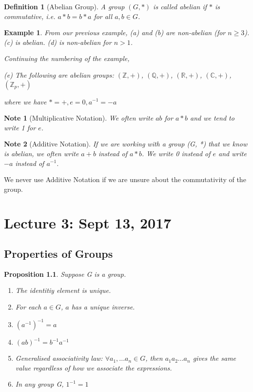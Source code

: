 \documentclass[11pt, oneside]{book}
\theoremstyle{break}
\newtheorem{propo}{Proposition}[section]
\newtheorem*{note}{Note}
\newtheorem{defn}{Definition}[section]
\newtheorem{eg}{Example}[section]
\newcommand{\bb}[1]{\mathbb{#1}}			%
\begin{document}
\begin{defn}[Abelian Group]
    A group $(G, *)$ is called abelian if $*$ is commutative, i.e. $a * b = b * a$ for all $a, b \in G$.
\end{defn}

\begin{eg}
   From our previous example, (a) and (b) are non-abelian (for $n \geq 3$). (c) is abelian. (d) is non-abelian for $n > 1$.

    Continuing the numbering of the example,

    (e) The following are abelian groups: $(\bb{Z}, +)$, $(\bb{Q}, +)$, $(\bb{R}, +)$, $(\bb{C}, +)$, $(\bb{Z}_p, +)$

    where we have $* = +, e = 0, a^{-1} = -a$
\end{eg}

\begin{note}[Multiplicative Notation]
    We often write $ab$ for $a*b$ and we tend to write 1 for $e$.
\end{note}

\begin{note}[Additive Notation]
    If we are working with a group (G, *) that we know is abelian, we often write $a + b$ instead of $a * b$. We write 0 instead of $e$ and write $-a$ instead of $a^{-1}$.
\end{note}

We never use Additive Notation if we are unsure about the commutativity of the group.

\chapter{Lecture 3: Sept 13, 2017}\label{lec3}

\section{Properties of Groups}

\begin{propo}
    Suppose G is a group.
    \begin{enumerate}
        \item The identitiy element is unique.
        \item For each $a \in G$, $a$ has a unique inverse.
        \item $(a^{-1})^{-1} = a$
        \item $(ab)^{-1} = b^{-1} a^{-1}$
        \item Generalised associativity law: $\forall a_1, ... a_n \in G$, then $a_1 a_2 ... a_n$ gives the same value regardless of how we associate the expressions.
        \item In any group G, $1^{-1} = 1$
    \end{enumerate}
\end{propo}
\end{document}
